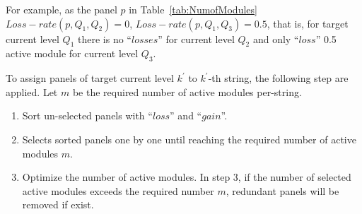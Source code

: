 \documentclass[journal]{IEEEtran}
\begin{document}
For example, as the panel $p$ in Table~\ref{tab:NumofModules} $Loss-rate(p,Q_{1},Q_{2})=0$, $Loss-rate(p,Q_{1},Q_{3})=0.5$, that is, for target current level $Q_{1}$ there is no ``$losses$'' for current level $Q_{2}$ and only ``$loss$'' 0.5 active module for current level $Q_{3}$.

To assign panels of target current level $k^{'}$ to $k^{'}$-th string, the following step are applied.
Let $m$ be the required number of active modules per-string.
\begin{enumerate}
  \item\label{step:1} Sort un-selected panels with ``$loss$'' and ``$gain$''.
\item\label{step:2} Selects sorted panels one by one until reaching the required number of active modules $m$.
\item\label{step:3} Optimize the number of active modules.
  In step 3, if the number of selected active modules exceeds the required number $m$, redundant panels will be removed if exist.
\end{enumerate}
\end{document}
